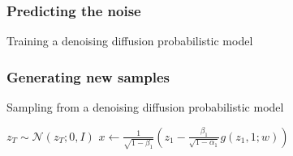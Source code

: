 \documentclass{beamer}
\begin{document}
\begin{frame}
    \frametitle{Predicting the noise}
    \begin{algorithm}[H]
        \caption{Training a denoising diffusion probabilistic model}
        \;
    \end{algorithm}
\end{frame}

\begin{frame}
    \frametitle{Generating new samples}
    \begin{algorithm}[H]
        \caption{Sampling from a denoising diffusion probabilistic model}
        $z_{T}\sim\mathcal{N}(z_{T};0,I)$\;
        $x\gets\frac{1}{\sqrt{1-\beta_{1}}}(z_{1}-\frac{\beta_{1}}{\sqrt{1-\alpha_{1}}}g(z_{1},1;w))$\;
        \;
    \end{algorithm}
\end{frame}
\end{document}
